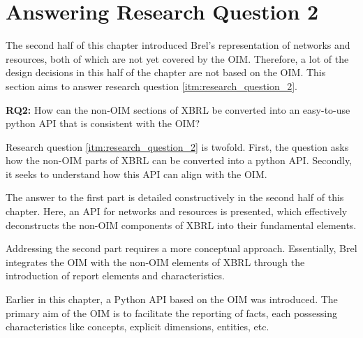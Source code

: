 \section{Answering Research Question 2}
\label{sec:answer_research_question_2}

The second half of this chapter introduced Brel's representation of networks and resources, 
both of which are not yet covered by the OIM.
Therefore, a lot of the design decisions in this half of the chapter are not based on the OIM.
This section aims to answer research question \ref{itm:research_question_2}.

\begin{displayquote}
    \textbf{RQ2:} How can the non-OIM sections of XBRL be converted into an easy-to-use python API that is consistent with the OIM?
\end{displayquote}

Research question \ref{itm:research_question_2} is twofold.
First, the question asks how the non-OIM parts of XBRL can be converted into a python API.
Secondly, it seeks to understand how this API can align with the OIM.

The answer to the first part is detailed constructively in the second half of this chapter. 
Here, an API for networks and resources is presented, which effectively deconstructs the non-OIM components of XBRL into their fundamental elements.

Addressing the second part requires a more conceptual approach. 
Essentially, Brel integrates the OIM with the non-OIM elements of XBRL through the introduction of report elements and characteristics.

Earlier in this chapter, a Python API based on the OIM was introduced. 
The primary aim of the OIM is to facilitate the reporting of facts, each possessing characteristics like concepts, explicit dimensions, entities, etc.

